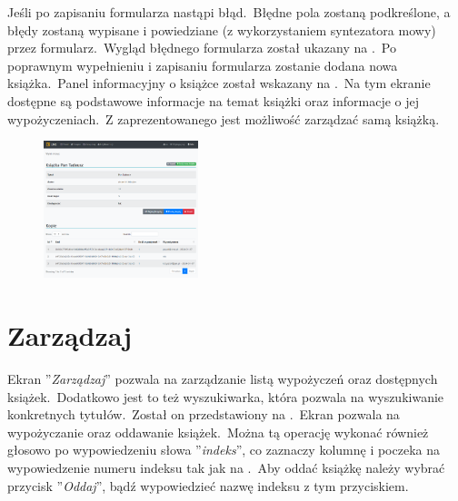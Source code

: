 Jeśli po zapisaniu formularza nastąpi błąd.\ Błędne pola zostaną podkreślone, a błędy zostaną wypisane i powiedziane (z wykorzystaniem syntezatora mowy) przez formularz.\ Wygląd błędnego formularza został ukazany na .\ Po poprawnym wypełnieniu i zapisaniu formularza zostanie dodana nowa książka.\ Panel informacyjny o książce został wskazany na .\ Na tym ekranie dostępne są podstawowe informacje na temat książki oraz informacje o jej wypożyczeniach.\ Z zaprezentowanego  jest możliwość zarządzać samą książką.

\begin{figure}[H]
    \centering
    \includegraphics[width=0.4\textwidth]{images/infobook}
    \label{lib:booki}
\end{figure}


\section{Zarządzaj}
Ekran ''\textit{Zarządzaj}'' pozwala na zarządzanie listą wypożyczeń oraz dostępnych książek.\ Dodatkowo jest to też wyszukiwarka, która pozwala na wyszukiwanie konkretnych tytułów.\ Został on przedstawiony na .\ Ekran pozwala na wypożyczanie oraz oddawanie książek.\ Można tą operację wykonać również głosowo po wypowiedzeniu słowa ''\textit{indeks}'', co zaznaczy kolumnę i poczeka na wypowiedzenie numeru indeksu tak jak na .\ Aby oddać książkę należy wybrać przycisk ''\textit{Oddaj}'', bądź wypowiedzieć nazwę indeksu z tym przyciskiem.

